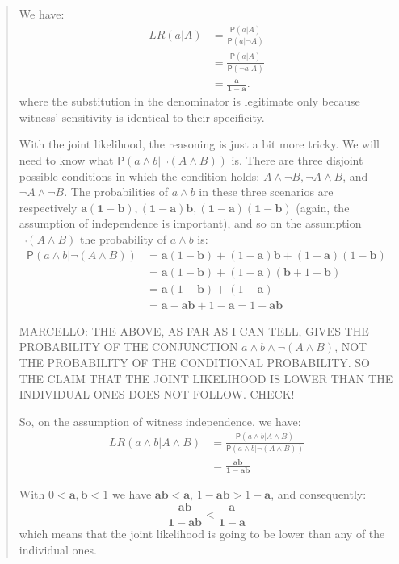 \documentclass[10pt,dvipsnames,enabledeprecatedfontcommands]{scrartcl}
\newcommand{\n}{\neg}
\newcommand{\et}{\wedge}
\newcommand{\pr}[1]{\mathsf{P}(#1)}
\begin{document}
\begin{quote}

We have: 
 \begin{align*}
 LR(a\vert A) & = \frac{\pr{a\vert A}}{\pr{a\vert \n A}}\\
 &= \frac{\pr{a\vert A}}{\pr{\n a\vert  A}} \\
& =  \frac{\mathbf{a}}{\mathbf{1-a}}.
\end{align*}
where the substitution in the denominator is legitimate only because witness' sensitivity is identical to their specificity. 


With the joint likelihood, the reasoning is just a bit more tricky. We will need to know what $\pr{a\et b \vert \n (A\et B)}$ is. There are three disjoint possible conditions in which the condition holds: $A\et \n B, \n A \et B$, and $\n A \et \n B$. The probabilities of $a\et b$ in these three scenarios are respectively $\mathbf{a(1-b),(1-a)b,(1-a)(1-b)}$ (again, the assumption of independence is important), and so on the assumption $\n(A\et B)$ the probability of $a\et b$ is:
\begin{align*}
\pr{a\et b \vert \n (A\et B)} & = 
\mathbf{a}(1-\mathbf{b})+(1-\mathbf{a})\mathbf{b}+(1-\mathbf{a})(1-\mathbf{b})\\ 
& = 
\mathbf{a}(1-\mathbf{b})+(1-\mathbf{a})(\mathbf{b} + 1-\mathbf{b})\\
& = \mathbf{a}(1-\mathbf{b})+(1-\mathbf{a})\\
& = \mathbf{a}-\mathbf{a}\mathbf{b}+1-\mathbf{a} = 1- \mathbf{a}\mathbf{b}
\end{align*}

MARCELLO: THE ABOVE, AS FAR AS I CAN TELL, GIVES THE PROBABILITY OF THE CONJUNCTION $a\et b \et \neg (A \et B)$,  NOT THE PROBABILITY OF THE CONDITIONAL PROBABILITY. SO THE CLAIM THAT THE JOINT LIKELIHOOD IS LOWER THAN THE INDIVIDUAL ONES DOES
NOT FOLLOW. CHECK!

So, on the assumption of witness independence, we have:
\begin{align*}
LR(a\et b \vert A \et B) & = \frac{\pr{a\et b \vert A \et B}}{\pr{a \et b\vert \n (A \et B)}} \\
& = \frac{\mathbf{ab}}{\mathbf{1-ab}}
\end{align*}

 With $0<\mathbf{a},\mathbf{b}<1$ we have $\mathbf{ab}<\mathbf{a}$, $1-\mathbf{ab}>1-\mathbf{a}$, and consequently:
 \[\frac{\mathbf{ab}}{\mathbf{1-ab}} < \frac{\mathbf{a}}{\mathbf{1-a}}\]
 which means that the joint likelihood is going to be lower than any of the individual ones.
\end{quote}
\end{document}
